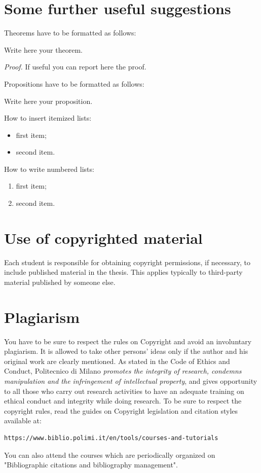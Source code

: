 \documentclass[11pt,a4paper]{article}
\begin{document}
\section{Some further useful suggestions}

Theorems have to be formatted as follows:
\begin{theorem}
\label{a_theorem}
Write here your theorem. 
\end{theorem}
\textit{Proof.} If useful you can report here the proof.
\vspace{0.3cm} %

Propositions have to be formatted as follows:
\begin{proposition}
Write here your proposition.
\end{proposition}
\vspace{0.3cm} %

How to insert itemized lists:
\begin{itemize}
    \item first item;
    \item second item.
\end{itemize}
How to write numbered lists:
\begin{enumerate}
    \item first item;
    \item second item.
\end{enumerate}

\section{Use of copyrighted material}

Each student is responsible for obtaining copyright permissions, if necessary, to include published material in the thesis.
This applies typically to third-party material published by someone else.

\section{Plagiarism}

You have to be sure to respect the rules on Copyright and avoid an involuntary plagiarism.
It is allowed to take other persons' ideas only if the author and his original work are clearly mentioned.
As stated in the Code of Ethics and Conduct, Politecnico di Milano \textit{promotes the integrity of research,
condemns manipulation and the infringement of intellectual property}, and gives opportunity to all those
who carry out research activities to have an adequate training on ethical conduct and integrity while doing research.
To be sure to respect the copyright rules, read the guides on Copyright legislation and citation styles available
at:
\begin{verbatim}
https://www.biblio.polimi.it/en/tools/courses-and-tutorials
\end{verbatim}
You can also attend the courses which are periodically organized on "Bibliographic citations and bibliography management".
\end{document}
